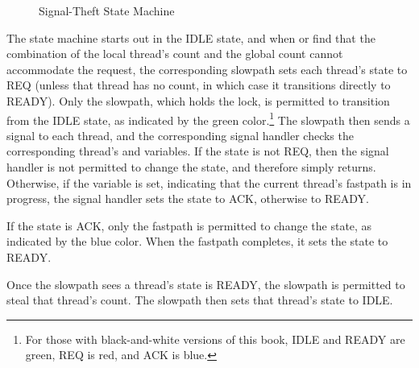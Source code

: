 \begin{figure}
\centering
{}
\caption{Signal-Theft State Machine}
\label{fig:count:Signal-Theft State Machine}
\end{figure}

The state machine starts out in the IDLE state, and when 
or  find that the combination of the local thread's count
and the global count cannot accommodate the request, the corresponding
slowpath sets each thread's  state to REQ (unless that thread
has no count, in which case it transitions directly to READY).
Only the slowpath, which holds the  lock, is permitted to
transition from the IDLE state, as indicated by the green color.\footnote{
	For those with black-and-white versions of this book,
	IDLE and READY are green, REQ is red, and ACK is blue.}
The slowpath then sends a signal to each thread, and the corresponding
signal handler checks the corresponding thread's  and
 variables.
If the  state is not REQ, then the signal handler is not
permitted to change the state, and therefore simply returns.
Otherwise, if the  variable is set, indicating that
the current thread's fastpath is in progress, the signal handler
sets the  state to ACK, otherwise to READY\@.

If the  state is ACK,
only the fastpath is permitted to change
the  state, as indicated by the blue color.
When the fastpath completes, it sets the  state to READY\@.

Once the slowpath sees a thread's  state is READY, the
slowpath is permitted to steal that thread's count.
The slowpath then sets that thread's  state to IDLE\@.


